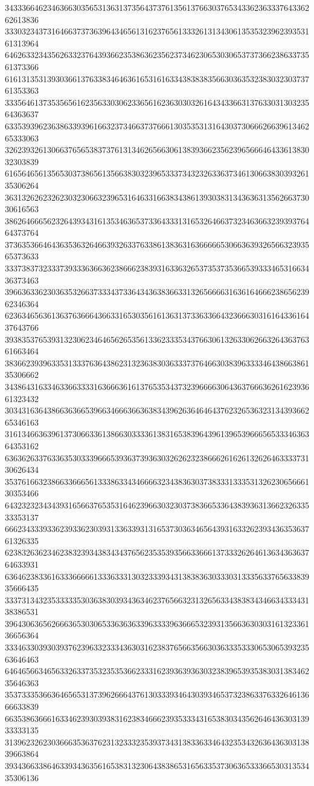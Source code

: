 34333664623463663035653136313735643737613561376630376534336236333764336262613836
33303234373164663737363964346561316237656133326131343061353532396239353161313964
64626332343562633237643936623538636235623734623065303065373736623863373561373366
61613135313930366137633834646361653161633438383835663036353238303230373761353363
33356461373535656162356330306233656162363030326164343366313763303130323564363637
63353939623638633939616632373466373766613035353131643037306662663961346265333063
32623932613066376565383737613134626566306138393662356239656664643361383032303839
61656465613565303738656135663830323965333734323263363734613066383039326135306264
36313262623262303230663239653164633166383438613930383134363631356266373030616563
38626466656232643934316135346365373364333131653264663732346366323939376464373764
37363536646436353632646639326337633861383631636666653066363932656632393565373633
33373837323337393336366362386662383931633632653735373536653933346531663436373463
39663633623036353266373334373364343638366331326566663163616466623865623962346364
62363465636136376366643663316530356161363137336336643236663031616433616437643766
39383537653931323062346465626535613362333534376630613263306266326436376361663464
38366239396335313337636438623132363830363337376466303839633334643866386135306662
34386431633463366333316366636161376535343732396666306436376663626162393661323432
30343163643866363665396634666366363834396263646464376232653632313439366265346163
31613466363961373066336138663033336138316538396439613965396665653334636364353162
63636263376336353033396665393637393630326262323866626162613262646333373130626434
35376166323866336665613338633434666632343836303738333133353132623065666130353466
64323232343439316566376535316462396630323037383665336438393631366232633533353137
66623433393362393362303931336339313165373036346564393163326239343635363761326335
62383263623462383239343834343765623535393566336661373332626461363436363764633931
63646238336163336666613336333130323339343138383630333031333563376563383935666435
33373134323533333530363830393436346237656632313265633438383434663433343138386531
39643063656266636530306533636363396333396366653239313566363030316132336136656364
33346330393039376239633233343630316238376566356630363335333065306539323563646463
64646566346563326337353235353662333162393639363032383965393538303138346235646363
35373335366364656531373962666437613033393464303934653732386337633264613666633839
66353863666163346239303938316238346662393533343165383034356264643630313933333135
31396232623036663536376231323332353937343138336334643235343263643630313839663864
39343663386463393436356165383132306438386531656335373063653336653031353435306136
